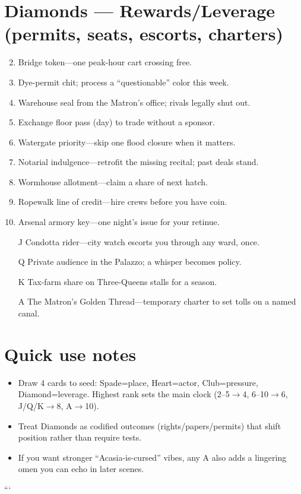 \section*{Diamonds --- Rewards/Leverage (permits, seats, escorts, charters)}
\begin{enumerate}
\setcounter{enumi}{1}
\item Bridge token---one peak-hour cart crossing free.
\item Dye-permit chit; process a ``questionable'' color this week.
\item Warehouse seal from the Matron's office; rivals legally shut out.
\item Exchange floor pass (day) to trade without a sponsor.
\item Watergate priority---skip one flood closure when it matters.
\item Notarial indulgence---retrofit the missing recital; past deals stand.
\item Wormhouse allotment---claim a share of next hatch.
\item Ropewalk line of credit---hire crews before you have coin.
\item Arsenal armory key---one night's issue for your retinue.
\item[J] Condotta rider---city watch escorts you through any ward, once.
\item[Q] Private audience in the Palazzo; a whisper becomes policy.
\item[K] Tax-farm share on Three-Queens stalls for a season.
\item[A] The Matron's Golden Thread---temporary charter to set tolls on a named canal.
\end{enumerate}

\section*{Quick use notes}
\begin{itemize}
\item Draw 4 cards to seed: Spade=place, Heart=actor, Club=pressure, Diamond=leverage. Highest rank sets the main clock (2--5$\rightarrow$4, 6--10$\rightarrow$6, J/Q/K$\rightarrow$8, A$\rightarrow$10).
\item Treat Diamonds as codified outcomes (rights/papers/permits) that shift position rather than require tests.
\item If you want stronger ``Acasia-is-cursed'' vibes, any A also adds a lingering omen you can echo in later scenes.
\end{itemize}
```
